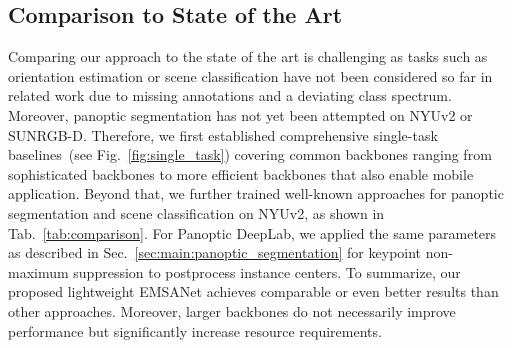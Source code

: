 \documentclass[conference]{IEEEtran}
\begin{document}
\subsection{Comparison to State of the Art}
\label{sec:experiments:comparison_to_sota}
Comparing our approach to the state of the art is challenging as tasks such as orientation estimation or scene classification have not been considered so far in related work due to missing annotations and a deviating class spectrum. 
Moreover, panoptic segmentation has not yet been attempted on NYUv2 or SUNRGB-D.
Therefore, we first established comprehensive single-task baselines~(see Fig.~\ref{fig:single_task}) covering common backbones ranging from sophisticated backbones to more efficient backbones that also enable mobile application.
Beyond that, we further trained well-known approaches for panoptic segmentation and scene classification on NYUv2, as shown in Tab.~\ref{tab:comparison}.
For Panoptic DeepLab, we applied the same parameters as described in Sec.~\ref{sec:main:panoptic_segmentation} for keypoint non-maximum suppression to postprocess instance centers.
To summarize, our proposed lightweight EMSANet achieves comparable or even better results than other approaches.
Moreover, larger backbones do not necessarily improve performance but significantly increase resource requirements.
\end{document}
